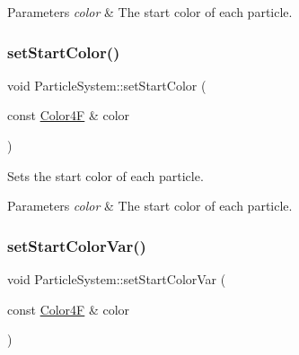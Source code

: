 \begin{DoxyParams}{Parameters}
{\em color} & The start color of each particle. \\
\hline
\end{DoxyParams}
\mbox{\label{classParticleSystem_a9a8cfdb5e2ef4a33ec198a58cfe31e19}} 
\subsubsection{\texorpdfstring{set\+Start\+Color()}{setStartColor()}\hspace{0.1cm}{\footnotesize\ttfamily [2/2]}}
{\footnotesize\ttfamily void Particle\+System\+::set\+Start\+Color (\begin{DoxyParamCaption}\item[{const \hyperlink{structColor4F}{Color4F} \&}]{color }\end{DoxyParamCaption})\hspace{0.3cm}{\ttfamily [inline]}}

Sets the start color of each particle.


\begin{DoxyParams}{Parameters}
{\em color} & The start color of each particle. \\
\hline
\end{DoxyParams}
\mbox{\label{classParticleSystem_ac18c55ba53459fe1c48ba14bdd2f2924}} 
\subsubsection{\texorpdfstring{set\+Start\+Color\+Var()}{setStartColorVar()}\hspace{0.1cm}{\footnotesize\ttfamily [1/2]}}
{\footnotesize\ttfamily void Particle\+System\+::set\+Start\+Color\+Var (\begin{DoxyParamCaption}\item[{const \hyperlink{structColor4F}{Color4F} \&}]{color }\end{DoxyParamCaption})\hspace{0.3cm}{\ttfamily [inline]}}

